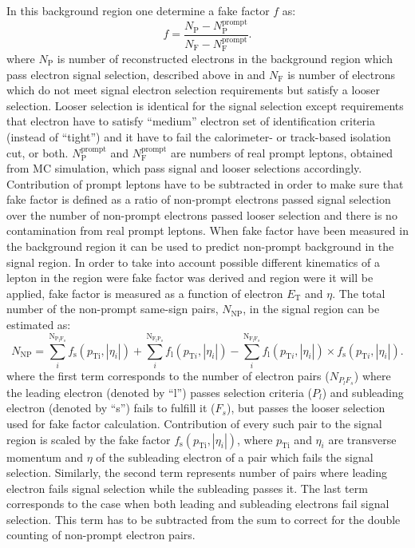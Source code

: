 In this background region one determine a fake factor $f$ as:
\begin{equation}
f = \frac{N_{\mathrm{P}} - N_{\mathrm{P}}^{\mathrm{prompt}}}{N_{\mathrm{F}}  - N_{\mathrm{F}}^{\mathrm{prompt}}}.
\label{eq:fakefactor}
\end{equation}
where $N_{\mathrm{P}}$ is number of reconstructed electrons in the background region which pass electron signal selection,
described above in  and $N_{\mathrm{F}}$ is number of electrons which do not meet 
signal electron selection requirements but satisfy a looser selection. Looser selection is identical for the signal selection except 
requirements that electron have to satisfy ``medium'' electron set of identification criteria~\cite{electron_tight} (instead of ``tight'') 
and it have to fail the calorimeter- or track-based isolation cut, or both.
$N_{\mathrm{P}}^{\mathrm{prompt}}$ and $N_{\mathrm{F}}^{\mathrm{prompt}}$ are numbers of real prompt
leptons, obtained from MC simulation, which pass signal and looser selections accordingly.
Contribution of prompt leptons have to be subtracted in order to make sure that 
fake factor is defined as a ratio of non-prompt electrons passed signal selection over 
the number of non-prompt electrons passed looser selection and there is no contamination from real prompt leptons.
When fake factor have been measured in the background region it can be used to predict non-prompt background in the signal region.
In order to take into account possible different kinematics of a lepton in the region were fake factor was derived 
and region were it will be applied, fake factor is measured as a function of electron $E_\mathrm{T}$ and $\eta$.
The total number of the non-prompt same-sign pairs, $N_{\mathrm{NP}}$, in the signal region can be estimated as:
\begin{equation}
N_{\mathrm{NP}} = \sum_{i}^{\mathrm{N_{P_l F_s}}} f_{\mathrm{s}}(p_{\mathrm{Ti}},|\eta_{i}|) + \sum_{i}^{\mathrm{N_{F_l P_s}}} f_{\mathrm{l}}(p_{\mathrm{T}i},|\eta_{i}|) - \sum_{i}^{\mathrm{N_{F_l F_s}}} f_{\mathrm{l}}(p_{\mathrm{T}i},|\eta_{i}|) \times f_{\mathrm{s}}(p_{\mathrm{T}i},|\eta_{i}|).
\label{eq:fake_pred}
\end{equation}
where the first term corresponds to the number of electron pairs ($N_{P_l F_s}$) 
where the leading electron (denoted by ``l'') passes selection criteria ($P_l$) and subleading electron 
(denoted by ``s'')
fails to fulfill it ($F_s$), but passes the looser selection used for fake factor calculation. 
Contribution of every such pair to the signal region is scaled by the fake factor 
$f_{\mathrm{s}}(p_{\mathrm{Ti}},|\eta_{i}|)$, where $p_\mathrm{Ti}$ and $\eta_{i}$ are transverse momentum and $\eta$
of the subleading electron of a pair which fails the signal selection. 
Similarly, the second term represents number of pairs where
leading electron fails signal selection while the subleading passes it. 
The last term corresponds to the case when both leading
and subleading electrons fail signal selection. This term has to be subtracted from the sum to correct for the double
counting of non-prompt electron pairs.

